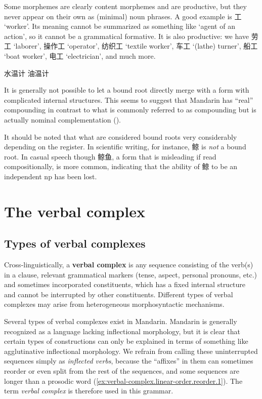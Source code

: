 \documentclass[UTF8, a4paper, oneside, scheme=plain, 12pt]{ctexrep}
\newcommand*{\concept}[1]{\textbf{#1}}
\newcommand*{\term}[1]{\emph{#1}}
\newcommand{\translate}[1]{`#1'}
\begin{document}
Some morphemes are clearly content morphemes and are productive,
but they never appear on their own as (minimal) noun phrases.
A good example is 工 \translate{worker}.
Its meaning cannot be summarized as something like \translate{agent of an action},
so it cannot be a grammatical formative.
It is also productive:
we have 劳工 \translate{laborer}, 操作工 \translate{operator}, 纺织工 \translate{textile worker}, 车工 \translate{(lathe) turner}, 船工 \translate{boat worker}, 电工 \translate{electrician}, and much more.

\begin{exe}
    \ex 水温计
    \ex 油温计
\end{exe}

It is generally not possible to let a bound root directly merge with a form with complicated internal structures.
This seems to suggest that Mandarin has ``real'' compounding in contrast to what is commonly referred to as compounding but is actually nominal complementation ().

It should be noted that what are considered bound roots very considerably depending on the register.
In scientific writing, for instance, 鲸 is \emph{not} a bound root.
In casual speech though 鲸鱼, a form that is misleading if read compositionally, is more common,
indicating that the ability of 鲸 to be an independent \ac{np} has been lost.



\chapter{The verbal complex}\label{chap:verbal-complex}

\section{Types of verbal complexes}\label{sec:verbal-complex.linear-order}

Cross-linguistically, a \concept{verbal complex} is
any sequence consisting of the verb(s) in a clause,
relevant grammatical markers (tense, aspect, personal pronouns, etc.)
and sometimes incorporated constituents,
which has a fixed internal structure and cannot be interrupted by other constituents.
Different types of verbal complexes may arise from
heterogeneous morphosyntactic mechanisms.

Several types of verbal complexes exist in Mandarin.
Mandarin is generally recognized as a language lacking inflectional morphology,
but it is clear that certain types of constructions
can only be explained in terms of something like agglutinative inflectional morphology.
We refrain from calling these uninterrupted sequences simply as \term{inflected verbs},
because the ``affixes'' in them can sometimes reorder or even split from the rest of the sequences,
and some sequences are longer than a prosodic word
(\ref{ex:verbal-complex.linear-order.reorder.1}).
The term \term{verbal complex} is therefore used in this grammar.
\end{document}

